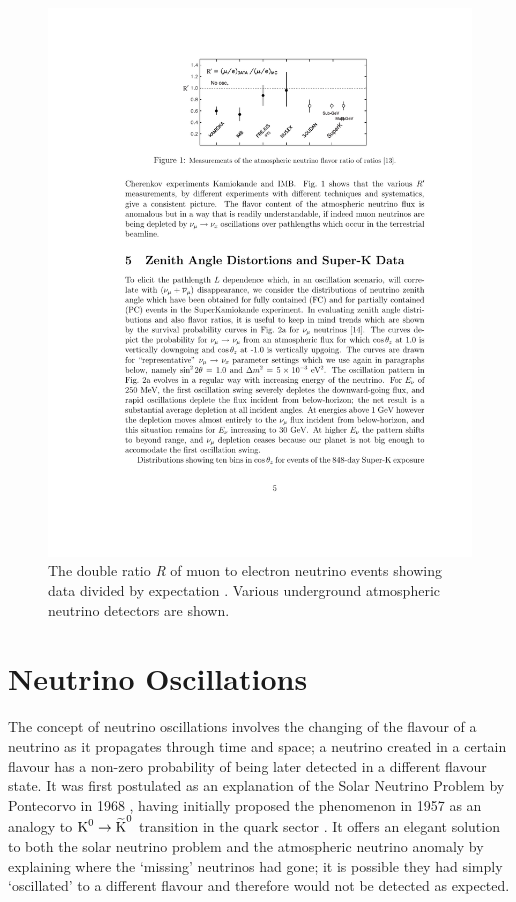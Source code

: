 \begin{figure}
  \centering
  \includegraphics[width=12cm]{AtmosphericNeutrinoAnomaly.pdf}
  \caption{The double ratio \textit{R} of muon to electron neutrino events showing data divided by expectation \cite{Mann1999}.  Various underground atmospheric neutrino detectors are shown.}
  \label{fig:AtmosphericNeutrinoAnomaly}
\end{figure}

\section{Neutrino Oscillations}\label{sec:NeutrinoOscillations}

The concept of neutrino oscillations involves the changing of the flavour of a neutrino as it propagates through time and space; a neutrino created in a certain flavour has a non-zero probability of being later detected in a different flavour state.  It was first postulated as an explanation of the Solar Neutrino Problem by Pontecorvo in 1968 \cite{Pontecorvo1968,Pontecorvo1969}, having initially proposed the phenomenon in 1957 as an analogy to $\textnormal{K}^0 \rightarrow \widetilde{\textnormal{K}}^0$ transition in the quark sector \cite{Pontecorvo1957}.  It offers an elegant solution to both the solar neutrino problem and the atmospheric neutrino anomaly by explaining where the `missing' neutrinos had gone; it is possible they had simply `oscillated' to a different flavour and therefore would not be detected as expected.


